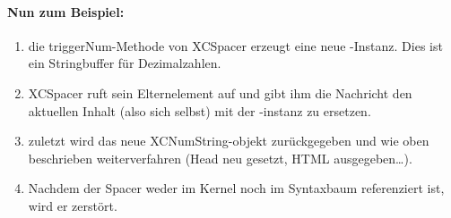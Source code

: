 \paragraph{Nun zum Beispiel:}
\begin{enumerate}
	\item die triggerNum-Methode von XCSpacer erzeugt eine neue -Instanz.
		Dies ist ein Stringbuffer für Dezimalzahlen.
	\item XCSpacer ruft sein Elternelement auf und gibt ihm die Nachricht den aktuellen Inhalt (also sich selbst) mit der -instanz zu ersetzen.
	\item zuletzt wird das neue XCNumString-objekt zurückgegeben und wie oben beschrieben weiterverfahren (Head neu gesetzt, HTML ausgegeben\ldots).
	\item Nachdem der Spacer weder im Kernel noch im Syntaxbaum referenziert ist, wird er zerstört.
\end{enumerate}

